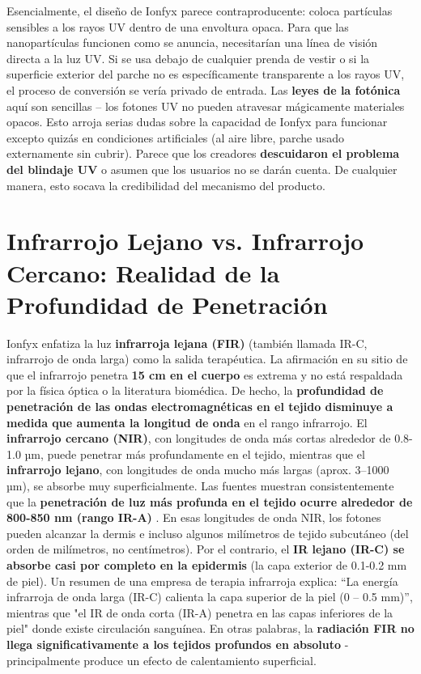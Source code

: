 \documentclass{article}
\begin{document}
Esencialmente, el diseño de Ionfyx parece contraproducente: coloca partículas sensibles a los rayos UV dentro de una envoltura opaca. Para que las nanopartículas funcionen como se anuncia, necesitarían una línea de visión directa a la luz UV. Si se usa debajo de cualquier prenda de vestir o si la superficie exterior del parche no es específicamente transparente a los rayos UV, el proceso de conversión se vería privado de entrada. Las \textbf{leyes de la fotónica} aquí son sencillas – los fotones UV no pueden atravesar mágicamente materiales opacos. Esto arroja serias dudas sobre la capacidad de Ionfyx para funcionar excepto quizás en condiciones artificiales (al aire libre, parche usado externamente sin cubrir). Parece que los creadores \textbf{descuidaron el problema del blindaje UV} o asumen que los usuarios no se darán cuenta. De cualquier manera, esto socava la credibilidad del mecanismo del producto.

\section{Infrarrojo Lejano vs. Infrarrojo Cercano: Realidad de la Profundidad de Penetración}

Ionfyx enfatiza la luz \textbf{infrarroja lejana (FIR)} (también llamada IR-C, infrarrojo de onda larga) como la salida terapéutica. La afirmación en su sitio de que el infrarrojo penetra \textbf{15 cm en el cuerpo} es extrema y no está respaldada por la física óptica o la literatura biomédica. De hecho, la \textbf{profundidad de penetración de las ondas electromagnéticas en el tejido disminuye a medida que aumenta la longitud de onda} en el rango infrarrojo. El \textbf{infrarrojo cercano (NIR)}, con longitudes de onda más cortas alrededor de 0.8-1.0 µm, puede penetrar más profundamente en el tejido, mientras que el \textbf{infrarrojo lejano}, con longitudes de onda mucho más largas (aprox. 3–1000 µm), se absorbe muy superficialmente. Las fuentes muestran consistentemente que la \textbf{penetración de luz más profunda en el tejido ocurre alrededor de 800-850 nm (rango IR-A)} \cite{frontiers_infrared}. En esas longitudes de onda NIR, los fotones pueden alcanzar la dermis e incluso algunos milímetros de tejido subcutáneo (del orden de milímetros, no centímetros). Por el contrario, el \textbf{IR lejano (IR-C) se absorbe casi por completo en la epidermis} (la capa exterior de 0.1-0.2 mm de piel). Un resumen de una empresa de terapia infrarroja explica: “La energía infrarroja de onda larga (IR-C) calienta la capa superior de la piel (0 – 0.5 mm)”, mientras que "el IR de onda corta (IR-A) penetra en las capas inferiores de la piel" donde existe circulación sanguínea. En otras palabras, la \textbf{radiación FIR no llega significativamente a los tejidos profundos en absoluto} - principalmente produce un efecto de calentamiento superficial.
\end{document}

